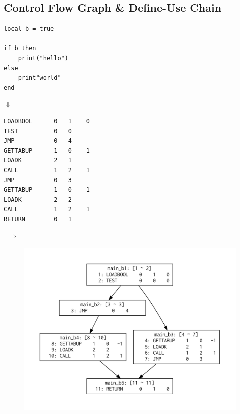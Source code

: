 \subsection{Control Flow Graph \& Define-Use Chain}
\begin{frame}[fragile]
\frametitlesubs
\begin{minipage}{.23\textwidth}
	\scriptsize
	\begin{lstlisting}[language={[5.3]lua}]
local b = true

if b then
	print("hello")
else
	print"world"
end
\end{lstlisting}

\pause
\vspace{-2\zw}
\begin{center}
	\normalsize
\noindent$\Downarrow$
\end{center}
\vspace{-2\zw}
\begin{lstlisting}
LOADBOOL      0   1    0
TEST          0   0 
JMP           0   4 
GETTABUP      1   0   -1
LOADK         2   1 
CALL          1   2    1
JMP           0   3 
GETTABUP      1   0   -1
LOADK         2   2 
CALL          1   2    1
RETURN        0   1 
\end{lstlisting}
\end{minipage}\pause
\begin{minipage}{.06\textwidth}
\begin{flushright}
	\ $\Rightarrow$
\end{flushright}
\end{minipage}
\begin{minipage}{.56\textwidth}
	\begin{figure}[h]
	\centering
	\includegraphics[width=1.3\textwidth]{figure/cfg.pdf}
	\end{figure}
\end{minipage}
\end{frame}
